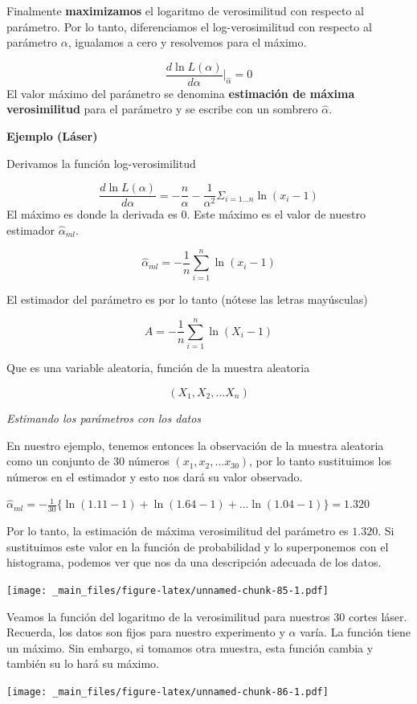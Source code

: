 \documentclass[
]{book}
\begin{document}
Finalmente \textbf{maximizamos} el logaritmo de verosimilitud con respecto al parámetro. Por lo tanto, diferenciamos el log-verosimilitud con respecto al parámetro \(\alpha\), igualamos a cero y resolvemos para el máximo.

\[\frac{d \ln L(\alpha)}{d \alpha} \big|_{\hat{\alpha}}=0 \]
El valor máximo del parámetro se denomina \textbf{estimación de máxima verosimilitud} para el parámetro y se escribe con un sombrero \(\hat{\alpha}\).

\textbf{Ejemplo (Láser)}

Derivamos la función log-verosimilitud

\[\frac{d \ln L(\alpha)}{d \alpha}= -\frac{n}{\alpha} - \frac{1}{\alpha^2} \Sigma_{i=1.. .n} \ln (x_i-1)\]
El máximo es donde la derivada es \(0\). Este máximo es el valor de nuestro estimador \(\hat{\alpha}_{ml}\).

\[\hat{\alpha}_{ml}=-\frac{1}{n}\sum_{i=1}^n \ln (x_i-1)\]

El estimador del parámetro es por lo tanto (nótese las letras mayúsculas)

\[A=-\frac{1}{n}\sum_{i=1}^n \ln (X_i-1)\]

Que es una variable aleatoria, función de la muestra aleatoria

\[(X_1, X_2, ... X_n)\]

\emph{Estimando los parámetros con los datos}

En nuestro ejemplo, tenemos entonces la observación de la muestra aleatoria como un conjunto de 30 números \((x_1, x_2, ...x_{30})\), por lo tanto sustituimos los números en el estimador y esto nos dará su valor observado.

\(\hat{\alpha}_{ml}=-\frac{1}{30}\{ \ln (1.11-1)+ \ln (1.64-1)+...\ln (1.04-1)\}=1.320\)

Por lo tanto, la estimación de máxima verosimilitud del parámetro es \(1.320\). Si sustituimos este valor en la función de probabilidad y lo superponemos con el histograma, podemos ver que nos da una descripción adecuada de los datos.

\texttt{[image: \_main\_files/figure-latex/unnamed-chunk-85-1.pdf]}

Veamos la función del logaritmo de la verosimilitud para nuestros \(30\) cortes láser. Recuerda, los datos son fijos para nuestro experimento y \(\alpha\) varía. La función tiene un máximo. Sin embargo, si tomamos otra muestra, esta función cambia y también su lo hará su máximo.

\texttt{[image: \_main\_files/figure-latex/unnamed-chunk-86-1.pdf]}
\end{document}
